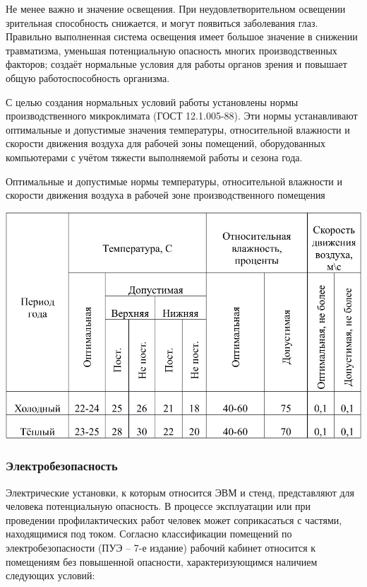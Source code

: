 Не менее важно и значение освещения. При неудовлетворительном освещении зрительная способность снижается, и могут появиться заболевания глаз. Правильно выполненная система освещения имеет большое значение в снижении травматизма, уменьшая потенциальную опасность многих производственных факторов; создаёт нормальные условия для работы органов зрения и повышает общую работоспособность организма.

С целью создания нормальных условий работы установлены нормы производственного микроклимата (ГОСТ 12.1.005-88)\cite{OT10}. Эти нормы устанавливают оптимальные и допустимые значения температуры, относительной влажности и скорости движения воздуха для рабочей зоны помещений, оборудованных компьютерами с учётом тяжести выполняемой работы и сезона года.

\begin{table}[!ht]
\caption{Оптимальные и допустимые нормы температуры, относительной влажности и скорости движения воздуха в рабочей зоне производственного помещения}
\centering
\includegraphics[page=1, width=1\linewidth]{secure_table.pdf}
\label{tab:micro_climat}
\end{table}
\subsubsection{Электробезопасность}

Электрические установки, к которым относится ЭВМ и стенд, представляют для человека потенциальную опасность. В процессе эксплуатации или при проведении профилактических работ человек может соприкасаться с частями, находящимися под током. Согласно классификации помещений по электробезопасности (ПУЭ – 7-е издание) рабочий кабинет относится к помещениям без повышенной опасности, характеризующимся наличием следующих условий:

